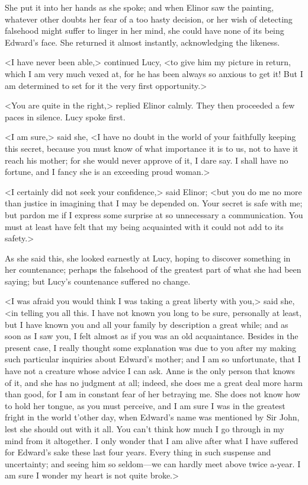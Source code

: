She put it into her hands as she spoke; and when Elinor saw the painting, whatever other doubts her fear of a too hasty decision, or her wish of detecting falsehood might suffer to linger in her mind, she could have none of its being Edward's face. She returned it almost instantly, acknowledging the likeness.

<I have never been able,> continued Lucy, <to give him my picture in return, which I am very much vexed at, for he has been always so anxious to get it! But I am determined to set for it the very first opportunity.>

<You are quite in the right,> replied Elinor calmly. They then proceeded a few paces in silence. Lucy spoke first.

<I am sure,> said she, <I have no doubt in the world of your faithfully keeping this secret, because you must know of what importance it is to us, not to have it reach his mother; for she would never approve of it, I dare say. I shall have no fortune, and I fancy she is an exceeding proud woman.>

<I certainly did not seek your confidence,> said Elinor; <but you do me no more than justice in imagining that I may be depended on. Your secret is safe with me; but pardon me if I express some surprise at so unnecessary a communication. You must at least have felt that my being acquainted with it could not add to its safety.>

As she said this, she looked earnestly at Lucy, hoping to discover something in her countenance; perhaps the falsehood of the greatest part of what she had been saying; but Lucy's countenance suffered no change.

<I was afraid you would think I was taking a great liberty with you,> said she, <in telling you all this. I have not known you long to be sure, personally at least, but I have known you and all your family by description a great while; and as soon as I saw you, I felt almost as if you was an old acquaintance. Besides in the present case, I really thought some explanation was due to you after my making such particular inquiries about Edward's mother; and I am so unfortunate, that I have not a creature whose advice I can ask. Anne is the only person that knows of it, and she has no judgment at all; indeed, she does me a great deal more harm than good, for I am in constant fear of her betraying me. She does not know how to hold her tongue, as you must perceive, and I am sure I was in the greatest fright in the world t'other day, when Edward's name was mentioned by Sir John, lest she should out with it all. You can't think how much I go through in my mind from it altogether. I only wonder that I am alive after what I have suffered for Edward's sake these last four years. Every thing in such suspense and uncertainty; and seeing him so seldom—we can hardly meet above twice a-year. I am sure I wonder my heart is not quite broke.>

